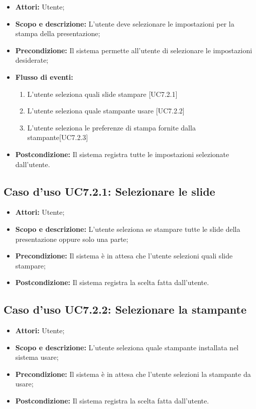 \begin{itemize}
	\item \textbf{Attori:} Utente;
	\item \textbf{Scopo e descrizione:} L'utente deve selezionare le impostazioni per la stampa della presentazione;
	\item \textbf{Precondizione:} Il sistema permette all'utente di selezionare le impostazioni desiderate;
	\item \textbf{Flusso di eventi:}
	\begin{enumerate}
		\item L'utente seleziona quali slide stampare [UC7.2.1]
		\item L'utente seleziona quale stampante usare [UC7.2.2]
		\item L'utente seleziona le preferenze di stampa fornite dalla stampante[UC7.2.3]
	\end{enumerate}
	\item \textbf{Postcondizione:} Il sistema registra tutte le impostazioni selezionate dall'utente.
\end{itemize}

	\subsection{Caso d'uso UC7.2.1: Selezionare le slide}
	\begin{itemize}
		\item \textbf{Attori:} Utente;
		\item \textbf{Scopo e descrizione:} L'utente seleziona se stampare tutte le slide della presentazione oppure solo una parte;
		\item \textbf{Precondizione:} Il sistema è in attesa che l'utente selezioni quali slide stampare;
		\item \textbf{Postcondizione:} Il sistema registra la scelta fatta dall'utente.
	\end{itemize}
	
	\subsection{Caso d'uso UC7.2.2: Selezionare la stampante}
	\begin{itemize}
		\item \textbf{Attori:} Utente;
		\item \textbf{Scopo e descrizione:} L'utente seleziona quale stampante installata nel sistema usare;
		\item \textbf{Precondizione:} Il sistema è in attesa che l'utente selezioni la stampante da usare;
		\item \textbf{Postcondizione:} Il sistema registra la scelta fatta dall'utente.
	\end{itemize}
	
